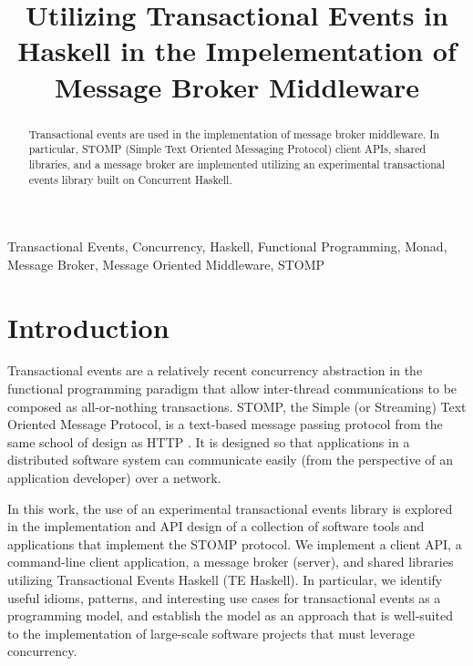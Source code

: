 \documentclass[conference, letterpaper]{IEEEtran}
\begin{document}
\title{Utilizing Transactional Events in Haskell in the Impelementation of Message Broker Middleware}

\author{
}


\maketitle

\begin{abstract}
Transactional events are used in the  implementation of message broker middleware. In particular, STOMP 
(Simple Text Oriented Messaging Protocol) client APIs, shared libraries, and a message broker are implemented 
utilizing an experimental transactional events library built on Concurrent Haskell.
\end{abstract}

\begin{IEEEkeywords}
Transactional Events, Concurrency, Haskell, Functional Programming, Monad, Message Broker, 
Message Oriented Middleware, STOMP
\end{IEEEkeywords}

\IEEEpeerreviewmaketitle

\section{Introduction}

Transactional events are a relatively recent concurrency abstraction in the functional programming
paradigm that allow inter-thread communications to be composed as all-or-nothing transactions. STOMP, the Simple (or Streaming) Text Oriented Message Protocol, is a text-based message passing protocol from the same school of design as HTTP \cite{stomp:spec}. It is designed so that applications in a distributed software system can communicate easily (from the perspective of an application developer) over a network. 

In this work, the use of an experimental transactional events library is explored in the implementation and API design of a collection of software tools and applications that implement the STOMP protocol. We implement a client API, a command-line client application, a message broker (server), and shared libraries utilizing 
Transactional Events Haskell (TE Haskell). In particular, we identify useful idioms, patterns,
and interesting use cases for transactional events as a programming model, and establish the model as an approach that is well-suited to the implementation of large-scale software projects that must leverage concurrency.
\end{document}
